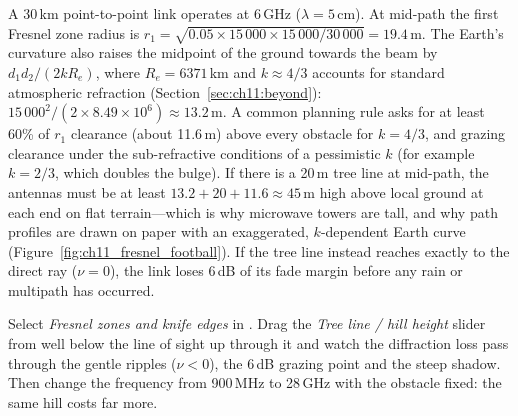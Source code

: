 
\begin{worked}
A 30\,km point-to-point link operates at 6\,GHz ($\lambda=5$\,cm). At mid-path the first Fresnel
zone radius is $r_1=\sqrt{0.05\times15\,000\times15\,000/30\,000}=19.4$\,m. The Earth's curvature
also raises the midpoint of the ground towards the beam by $d_1d_2/(2kR_e)$, where $R_e=6371$\,km
and $k\approx4/3$ accounts for standard atmospheric refraction (Section~\ref{sec:ch11:beyond}):
$15\,000^2/(2\times8.49\times10^6)\approx13.2$\,m. A common planning rule asks for at least 60\% of
$r_1$ clearance (about 11.6\,m) above every obstacle for $k=4/3$, and grazing clearance under the
sub-refractive conditions of a pessimistic $k$ (for example $k=2/3$, which doubles the bulge). If
there is a 20\,m tree line at mid-path, the antennas must be at least $13.2+20+11.6\approx45$\,m
high above local ground at each end on flat terrain---which is why microwave towers are tall, and
why path profiles are drawn on paper with an exaggerated, $k$-dependent Earth curve
(Figure~\ref{fig:ch11_fresnel_football}). If the tree line instead reaches exactly to the direct
ray ($\nu=0$), the link loses 6\,dB of its fade margin before any rain or multipath has occurred.
\end{worked}




\begin{tryit}
Select \emph{Fresnel zones and knife edges} in . Drag the
\emph{Tree line / hill height} slider from well below the line of sight up through it and watch the diffraction loss pass
through the gentle ripples ($\nu<0$), the 6\,dB grazing point and the steep shadow. Then change
the frequency from 900\,MHz to 28\,GHz with the obstacle fixed: the same hill costs far more.
\end{tryit}

